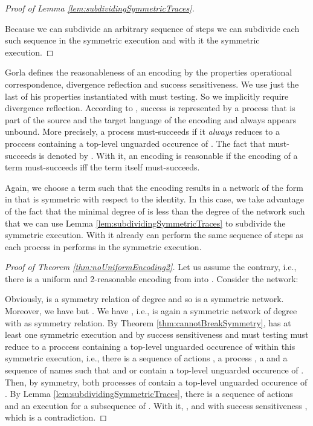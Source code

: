 \documentclass[11pt,techReport]{eptcs}
\begin{document}
\begin{proof}[Proof of Lemma \ref{lem:subdividingSymmetricTraces}]
\begin{description}
	\end{description}
	Because we can subdivide an arbitrary sequence of  steps we can subdivide each such sequence in the symmetric execution and with it the symmetric execution.
\end{proof}

Gorla \cite{gorla08d} defines the reasonableness of an encoding by the properties operational correspondence, divergence reflection and success sensitiveness. We use just the last of his properties instantiated with must testing. So we implicitly require divergence reflection. According to \cite{gorla08d}, success is represented by a process  that is part of the source and the target language of the encoding and always appears unbound. More precisely, a process must-succeeds if it \emph{always} reduces to a proccess containing a top-level unguarded occurence of . The fact that  must-succeeds is denoted by . With it, an encoding is reasonable if the encoding of a term must-succeeds iff the term itself must-succeeds.


Again, we choose a term such that the encoding results in a network of the form  in \procsep that is symmetric with respect to the identity. In this case, we take advantage of the fact that the minimal degree of  is less than the degree of the network such that we can use Lemma \ref{lem:subdividingSymmetricTraces} to subdivide the symmetric execution. With it already  can perform the same sequence of steps as each process in  performs in the symmetric execution.

\begin{proof}[Proof of Theorem \ref{thm:noUniformEncoding2}]
	Let us assume the contrary, i.e., there is a uniform and 2-reasonable encoding  from \pimix into \pisep. Consider the network:
	
	Obviously,  is a symmetry relation of degree  and so  is a symmetric network. Moreover, we have  but . We have , i.e.,  is again a symmetric network of degree  with  as symmetry relation. By Theorem \ref{thm:cannotBreakSymmetry},  has at least one symmetric execution and by success sensitiveness and must testing  must reduce to a proccess containing a top-level unguarded occurence of  within this symmetric execution, i.e., there is a sequence of actions , a process , a  and a sequence of names  such that  and  or  contain a top-level unguarded occurence of . Then, by symmetry, both processes of  contain a top-level unguarded occurence of . By Lemma \ref{lem:subdividingSymmetricTraces}, there is a sequence of actions  and an execution  for a subsequence  of . With it, , and with success sensitiveness , which is a contradiction.
\end{proof}
\end{document}
